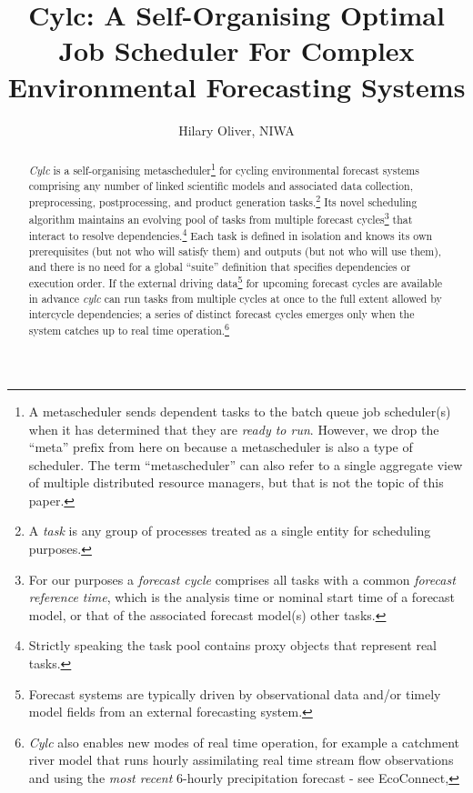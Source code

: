 \documentclass[11pt,a4paper]{article}
\title{Cylc: A Self-Organising Optimal Job Scheduler 
For Complex Environmental Forecasting Systems}
\author{Hilary Oliver, NIWA}
\begin{document}
\maketitle

\pagebreak
\tableofcontents
\pagebreak

\begin{abstract}

    {\em Cylc} is a self-organising metascheduler\footnote{A
    metascheduler sends dependent tasks to the batch queue job
    scheduler(s) when it has determined that they are {\em ready to
    run}. However, we drop the ``meta'' prefix from here on because a
    metascheduler is also a type of scheduler. The term
    ``metascheduler'' can also refer to a single aggregate view of
    multiple distributed resource managers, but that is not the topic of
    this paper.} for cycling environmental forecast systems comprising
    any number of linked scientific models and associated data
    collection, preprocessing, postprocessing, and product generation
    tasks.\footnote{A {\em task} is any group of processes treated as a
    single entity for scheduling purposes.} Its novel scheduling
    algorithm maintains an evolving pool of tasks from multiple forecast
    cycles\footnote{For our purposes a {\em forecast cycle} comprises
    all tasks with a common {\em forecast reference time}, which is the
    analysis time or nominal start time of a forecast model, or that of
    the associated forecast model(s) other tasks.} that interact to
    resolve dependencies.\footnote{Strictly speaking the task pool
    contains proxy objects that represent real tasks.} Each task is
    defined in isolation and knows its own prerequisites (but not who
    will satisfy them) and outputs (but not who will use them), and
    there is no need for a global ``suite'' definition that specifies
    dependencies or execution order.  If the external driving
    data\footnote{Forecast systems are typically driven by observational
    data and/or timely model fields from an external forecasting
    system.} for upcoming forecast cycles are available in advance {\em
    cylc} can run tasks from multiple cycles at once to the full extent
    allowed by intercycle dependencies; a series of distinct forecast
    cycles emerges only when the system catches up to real time
    operation.\footnote{{\em Cylc} also enables new modes of real time
    operation, for example a catchment river model that runs hourly
    assimilating real time stream flow observations and using the {\em
    most recent} 6-hourly precipitation forecast - see EcoConnect,
}
\end{abstract}
\end{document}
